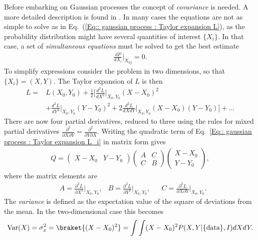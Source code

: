 \documentclass[twoside,english]{uiofysmaster}
\begin{document}
Before embarking on Gaussian processes the concept of \textit{covariance} is needed. A more detailed description is found in \cite{sivia2006data}. In many cases the equations are not as simple to solve as in Eq.\ (\ref{Eq:: gaussian process : Taylor expansion L}), as the probability distribution might have several quantities of interest $\{ X_i \}$. In that case, a set of \textit{simultaneous equations} must be solved to get the best estimate
\begin{align}\label{Eq:: gaussian process : Best estimate X_i}
\frac{dP}{dX_i} \Big|_{X_{0j}} =0.
\end{align}
To simplify expressions consider the problem in two dimensions, so that $\{ X_i \} = (X, Y)$. The Taylor expansion of $L$ is then
\begin{align}\label{Eq:: gaussian process : Taylor expansion L_i}
L =& L(X_0, Y_0) + \frac{1}{2} \Big[ \frac{d^2L}{dX^2}  \Big|_{X_0, Y_0}(X-X_0)^2 \nonumber \\
& + \frac{d^2L}{dY^2}  \Big|_{X_0, Y_0}(Y-Y_0)^2 + 2 \frac{d^2L}{dXdY}  \Big|_{X_0, Y_0}(X-X_0)(Y-Y_0) \Big] +...
\end{align}
There are now four partial derivatives, reduced to three using the rules for mixed partial derivatives $\frac{\partial^2}{\partial X \partial Y} = \frac{\partial^2}{\partial Y \partial X}$. Writing the quadratic term of Eq.~\ref{Eq:: gaussian process : Taylor expansion L_i} in matrix form gives
\begin{align}
Q = 
\begin{pmatrix}
X-X_0 & Y -Y_0
\end{pmatrix}
\begin{pmatrix}
A & C\\
C & B
\end{pmatrix}
\begin{pmatrix}
X -X_0\\
Y-Y_0
\end{pmatrix},
\end{align}
where the matrix elements are
\begin{align}
&A = \frac{\partial^2 L}{\partial X^2} \Big|_{X_0, Y_0}, &B = \frac{\partial^2 L}{\partial Y^2} \Big|_{X_0, Y_0}, &&C = \frac{\partial^2 L}{\partial X \partial Y} \Big|_{X_0, Y_0}.
\end{align}
The \textit{variance} is defined as the expectation value of the square of deviations from the mean. In the two-dimensional case this becomes \cite{sivia2006data}
\begin{align}
\text{Var}(X) = \sigma_x^2 = \braket{(X - X_0)^2} = \int \int (X - X_0)^2 P (X, Y | \{\text{data}\}, I) dXdY.
\end{align}
\end{document}
